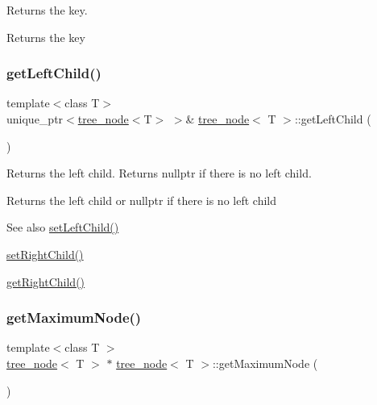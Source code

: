 Returns the key. \begin{DoxyReturn}{Returns}
the key 
\end{DoxyReturn}
\mbox{\label{classtree__node_ae161b70a3780e0cb3ecd4b57acc9e2d1}} 
\subsubsection{\texorpdfstring{get\+Left\+Child()}{getLeftChild()}}
{\footnotesize\ttfamily template$<$class T$>$ \\
unique\+\_\+ptr$<$\hyperlink{classtree__node}{tree\+\_\+node}$<$T$>$ $>$\& \hyperlink{classtree__node}{tree\+\_\+node}$<$ T $>$\+::get\+Left\+Child (\begin{DoxyParamCaption}{ }\end{DoxyParamCaption})\hspace{0.3cm}{\ttfamily [inline]}}

Returns the left child. Returns nullptr if there is no left child. \begin{DoxyReturn}{Returns}
the left child or nullptr if there is no left child 
\end{DoxyReturn}
\begin{DoxySeeAlso}{See also}
\hyperlink{classtree__node_a3db979969a0fe8505ba65c7afabb5463}{set\+Left\+Child()} 

\hyperlink{classtree__node_afea4c6595dafba65b5c4e59ca3da30f3}{set\+Right\+Child()} 

\hyperlink{classtree__node_a5e584d47f2c11941fe0406836fe50159}{get\+Right\+Child()} 
\end{DoxySeeAlso}
\mbox{\label{classtree__node_a70bdade8011a6a46b083ea680fcea52f}} 
\subsubsection{\texorpdfstring{get\+Maximum\+Node()}{getMaximumNode()}}
{\footnotesize\ttfamily template$<$class T $>$ \\
\hyperlink{classtree__node}{tree\+\_\+node}$<$ T $>$ $\ast$ \hyperlink{classtree__node}{tree\+\_\+node}$<$ T $>$\+::get\+Maximum\+Node (\begin{DoxyParamCaption}{ }\end{DoxyParamCaption})}

